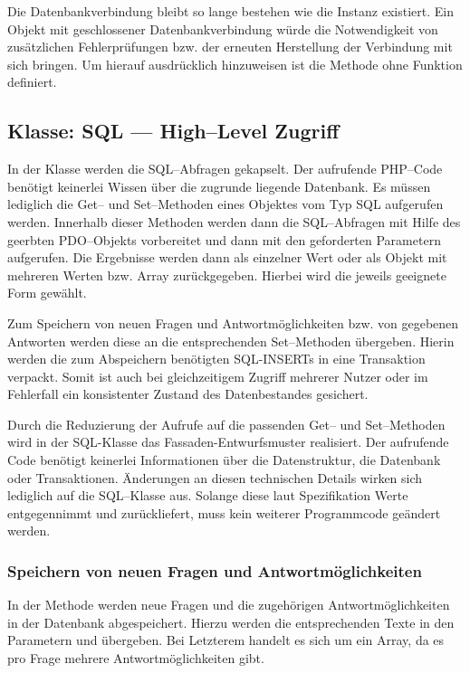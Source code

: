 Die Datenbankverbindung bleibt so lange bestehen wie die Instanz existiert. Ein Objekt mit geschlossener Datenbankverbindung würde die Notwendigkeit von zusätzlichen Fehlerprüfungen bzw. der erneuten Herstellung der Verbindung mit sich bringen. Um hierauf ausdrücklich hinzuweisen ist die Methode  ohne Funktion definiert.
 
\subsection{Klasse: SQL --- High--Level Zugriff}

In der Klasse  werden die SQL--Abfragen gekapselt. Der aufrufende PHP--Code benötigt keinerlei Wissen über die zugrunde liegende Datenbank. Es müssen lediglich die Get-- und Set--Methoden eines Objektes vom Typ SQL aufgerufen werden. Innerhalb dieser Methoden werden dann die SQL--Abfragen mit Hilfe des geerbten PDO--Objekts vorbereitet und dann mit den geforderten Parametern aufgerufen. Die Ergebnisse werden dann als einzelner Wert oder als Objekt mit mehreren Werten bzw. Array zurückgegeben. Hierbei wird die jeweils geeignete Form gewählt.

Zum Speichern von neuen Fragen und Antwortmöglichkeiten bzw. von gegebenen Antworten werden diese an die entsprechenden Set--Methoden übergeben. Hierin werden die zum Abspeichern benötigten SQL-INSERTs in eine Trans\-aktion verpackt. Somit ist auch bei gleichzeitigem Zugriff mehrerer Nutzer oder im Fehlerfall ein konsistenter Zustand des Datenbestandes gesichert.

Durch die Reduzierung der Aufrufe auf die passenden Get-- und Set--Methoden wird in der SQL-Klasse das Fassaden-Entwurfsmuster realisiert. Der aufrufende Code benötigt keinerlei Informationen über die Datenstruktur, die Datenbank oder Transaktionen. Änderungen an diesen technischen Details wirken sich lediglich auf die SQL--Klasse aus. Solange diese laut Spezifikation Werte entgegennimmt und zurückliefert, muss kein weiterer Programmcode geändert werden.

\subsubsection{Speichern von neuen Fragen und Antwortmöglichkeiten}
\label{sec:speichern}
In der Methode  werden neue Fragen und die zugehörigen Antwortmöglichkeiten in der Datenbank abgespeichert. Hierzu werden die entsprechenden Texte in den Parametern  und  übergeben. Bei Letzterem handelt es sich um ein Array, da es pro Frage mehrere Antwortmöglichkeiten gibt.


